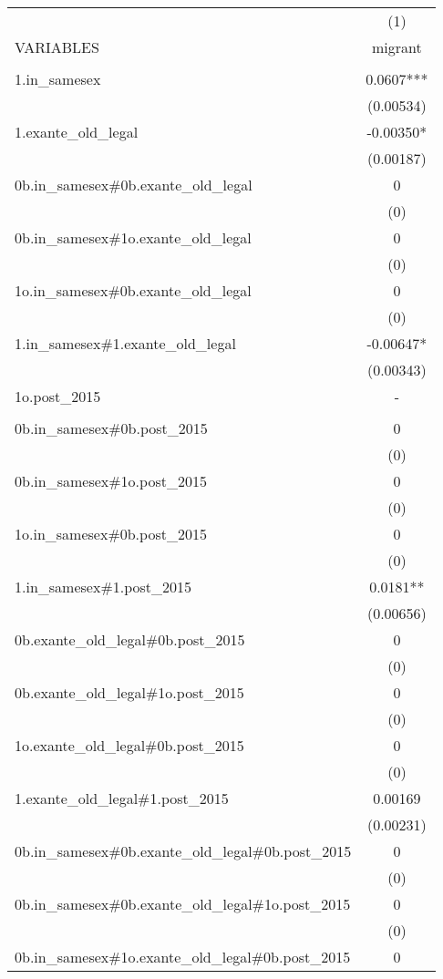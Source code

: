 \documentclass[]{article}
\begin{document}
\begin{tabular}{lc} \hline
 & (1) \\
VARIABLES & migrant \\ \hline
 &  \\
1.in\_samesex & 0.0607*** \\
 & (0.00534) \\
1.exante\_old\_legal & -0.00350* \\
 & (0.00187) \\
0b.in\_samesex\#0b.exante\_old\_legal & 0 \\
 & (0) \\
0b.in\_samesex\#1o.exante\_old\_legal & 0 \\
 & (0) \\
1o.in\_samesex\#0b.exante\_old\_legal & 0 \\
 & (0) \\
1.in\_samesex\#1.exante\_old\_legal & -0.00647* \\
 & (0.00343) \\
1o.post\_2015 & - \\
 &  \\
0b.in\_samesex\#0b.post\_2015 & 0 \\
 & (0) \\
0b.in\_samesex\#1o.post\_2015 & 0 \\
 & (0) \\
1o.in\_samesex\#0b.post\_2015 & 0 \\
 & (0) \\
1.in\_samesex\#1.post\_2015 & 0.0181** \\
 & (0.00656) \\
0b.exante\_old\_legal\#0b.post\_2015 & 0 \\
 & (0) \\
0b.exante\_old\_legal\#1o.post\_2015 & 0 \\
 & (0) \\
1o.exante\_old\_legal\#0b.post\_2015 & 0 \\
 & (0) \\
1.exante\_old\_legal\#1.post\_2015 & 0.00169 \\
 & (0.00231) \\
0b.in\_samesex\#0b.exante\_old\_legal\#0b.post\_2015 & 0 \\
 & (0) \\
0b.in\_samesex\#0b.exante\_old\_legal\#1o.post\_2015 & 0 \\
 & (0) \\
0b.in\_samesex\#1o.exante\_old\_legal\#0b.post\_2015 & 0 \\

\end{tabular}
\end{document}
